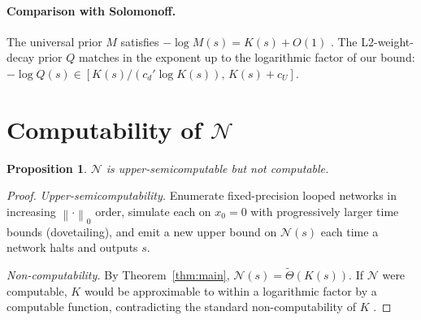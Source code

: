 \documentclass{article}
\newtheorem{proposition}[theorem]{Proposition}
\theoremstyle{definition}
\newcommand{\norm}[1]{\left\lVert#1\right\rVert}
\newcommand{\nc}{\mathcal{N}}
\begin{document}
\paragraph{Comparison with Solomonoff.} The universal prior $M$ satisfies $-\log M(s) = K(s) + O(1)$
\citep{li2008introduction}. The L2-weight-decay prior $Q$ matches in the
exponent up to the logarithmic factor of our bound: $-\log Q(s) \in [K(s)/(c_d'
    \log K(s)),\, K(s) + c_U]$.

\section{Computability of $\nc$}\label{app:computability}

\begin{proposition}
  $\nc$ is upper-semicomputable but not computable.
\end{proposition}

\begin{proof}
  \emph{Upper-semicomputability.} Enumerate fixed-precision looped networks in increasing $\norm{\cdot}_0$ order, simulate each on $x_0 = 0$ with progressively larger time bounds (dovetailing), and emit a new upper bound on $\nc(s)$ each time a network halts and outputs $s$.

  \emph{Non-computability.} By Theorem~\ref{thm:main}, $\nc(s) = \tilde\Theta(K(s))$. If $\nc$ were computable, $K$ would be approximable to within a logarithmic factor by a computable function, contradicting the standard non-computability of $K$ \citep{li2008introduction}.
\end{proof}


% 
\end{document}
